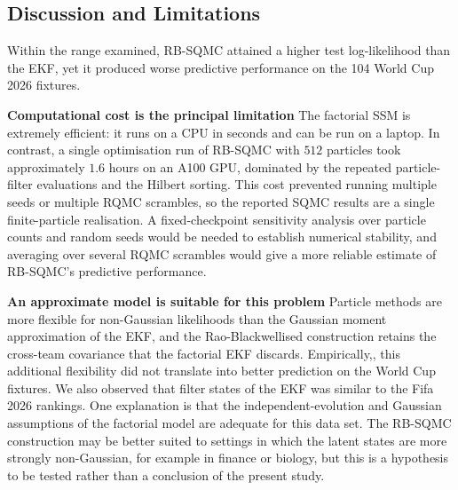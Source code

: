 \subsection{Discussion and Limitations}

Within the range examined, RB-SQMC attained a higher test log-likelihood than the EKF, yet it produced worse predictive performance on the 104 World Cup 2026 fixtures. 


\textbf{Computational cost is the principal limitation} The factorial SSM is extremely efficient: it runs on a CPU in seconds and can be run on a laptop. In contrast, a single optimisation run of RB-SQMC with $512$ particles took approximately $1.6$ hours on an A100 GPU, dominated by the repeated particle-filter evaluations and the Hilbert sorting. This cost prevented running multiple seeds or multiple RQMC scrambles, so the reported SQMC results are a single finite-particle realisation. A fixed-checkpoint sensitivity analysis over particle counts and random seeds would be needed to establish numerical stability, and averaging over several RQMC scrambles would give a more reliable estimate of RB-SQMC's predictive performance.

\textbf{An approximate model is suitable for this problem} Particle methods are more flexible for non-Gaussian likelihoods than the Gaussian moment approximation of the EKF, and the Rao-Blackwellised construction retains the cross-team covariance that the factorial EKF discards. Empirically,, this additional flexibility did not translate into better prediction on the World Cup fixtures. We also observed that filter states of the EKF was similar to the Fifa 2026 rankings. One explanation is that the independent-evolution and Gaussian assumptions of the factorial model are adequate for this data set. The RB-SQMC construction may be better suited to settings in which the latent states are more strongly non-Gaussian, for example in finance or biology, but this is a hypothesis to be tested rather than a conclusion of the present study.


